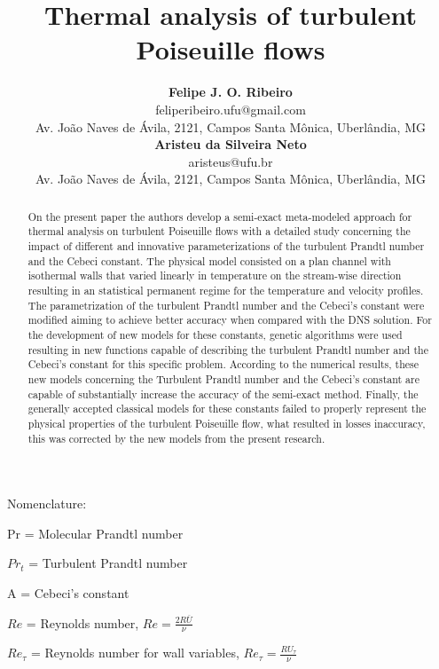 \documentclass[10pt]{article} %
\title{ \loll Thermal analysis of turbulent Poiseuille flows}
\author{\textbf{Felipe J. O. Ribeiro} \\ 
	    \small{feliperibeiro.ufu@gmail.com} \\
	    \vspace{0.2cm}
	    \small{Av. Jo\~{a}o Naves de \'Avila, 2121, Campos Santa M\^{o}nica, Uberl\^{a}ndia, MG}\\
	    \textbf{Aristeu da Silveira Neto}\\
	    \small{aristeus@ufu.br}\\
    \small{Av. Jo\~{a}o Naves de \'Avila, 2121, Campos Santa M\^{o}nica, Uberl\^{a}ndia, MG}\\
}
\begin{document}
	

\maketitle


\begin{abstract}
	\noindent On the present paper the authors develop a semi-exact meta-modeled approach for thermal analysis on turbulent Poiseuille flows with a detailed study concerning the impact of different and innovative parameterizations of the turbulent Prandtl number and the Cebeci constant. The physical model consisted on a plan channel with isothermal walls that varied linearly in temperature on the stream-wise direction resulting in an statistical permanent regime for the temperature and velocity profiles. The parametrization of the turbulent Prandtl number and the Cebeci's constant were modified aiming to achieve better accuracy when compared with the DNS solution. For the development of new models for these constants, genetic algorithms were used resulting in new functions capable of describing the turbulent Prandtl number and the Cebeci's constant for this specific problem. According to the numerical results, these new models concerning the Turbulent Prandtl number and the Cebeci's constant are capable of substantially increase the accuracy of the semi-exact method. Finally, the generally accepted classical models for these constants failed to properly represent the physical properties of the turbulent Poiseuille flow, what resulted in losses inaccuracy, this was corrected by the new models from the present research.     
\end{abstract} 

\vspace{8.0mm}

\begin{LARGE}
	Nomenclature: 
\end{LARGE} 


	Pr = Molecular Prandtl number
	
	$ Pr_t $ = Turbulent Prandtl number 
	
	A = Cebeci's constant
	
	
	$Re$ = Reynolds number, $Re = \frac{2R \overline{U}}{\nu}$
	
	
	$Re_\tau$ = Reynolds number for wall variables, $Re_\tau = \frac{R U_\tau}{\nu}$
	
\end{document}
